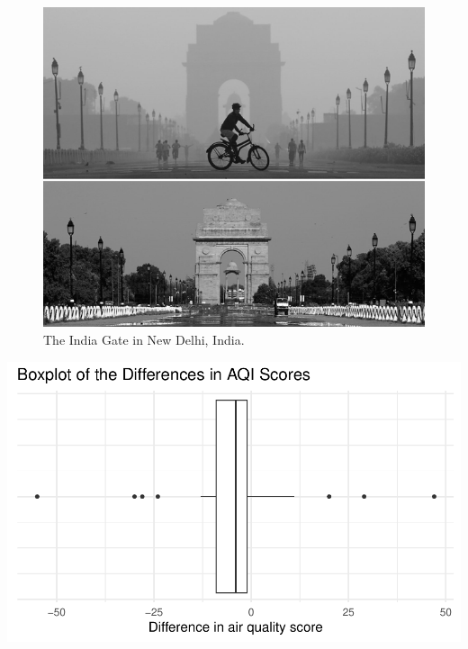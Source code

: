 \documentclass[
]{report}
\begin{document}
\begin{figure}

{\centering \includegraphics[width=0.6\linewidth]{images/air_pollution_greyscale} 

}

\caption{The India Gate in New Delhi, India.}\label{fig:covid}
\end{figure}

\vspace{.05in}

\begin{center}\includegraphics[width=0.6\linewidth]{11-A09-paired-simulation_files/figure-latex/unnamed-chunk-2-1} \end{center}

\vspace{.2in}
\end{document}
